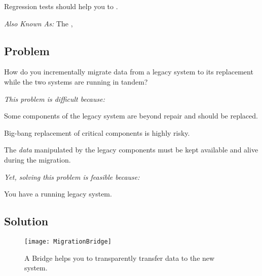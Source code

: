 \documentclass[a4paper,10pt,twoside]{book}
\begin{document}
Regression tests should help you to .


\emph{Also Known As:}  The  \cite{Kell00a},  \cite{Brod95a}


\subsection*{Problem}

How do you incrementally migrate data from a legacy system to its replacement while the two systems are running in tandem?

\emph{This problem is difficult because:} 

\begin{bulletlist}
\item Some components of the legacy system are beyond repair and should be replaced.

\item Big-bang replacement of critical components is highly risky.

\item The \emph{data} manipulated by the legacy components must be kept available and alive during the migration.
\end{bulletlist}

\emph{Yet, solving this problem is feasible because:}

\begin{bulletlist}
\item You have a running legacy system.
\end{bulletlist}

\subsection*{Solution}

\begin{figure}
\begin{center}
\texttt{[image: MigrationBridge]}
\caption{A Bridge helps you to transparently transfer data to the new system.}
\end{center}
\end{figure}
\end{document}
